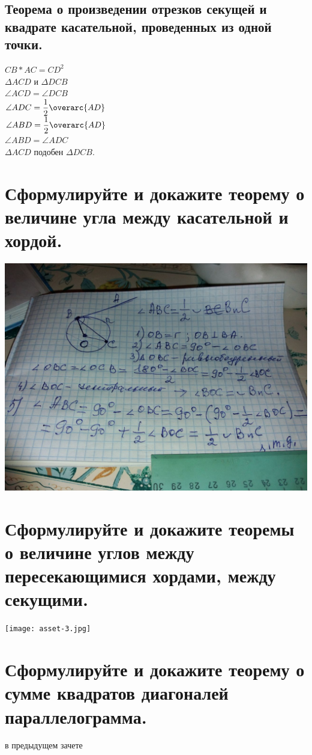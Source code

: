 \documentclass[12pt, letterpaper]{article}
\begin{document}
\subsection{Теорема о произведении отрезков секущей и квадрате касательной, проведенных из одной точки.}
\textbf{$CB*AC=CD^2$ \\}
$\Delta ACD $ и $ \Delta DCB $ \\
$ \angle ACD = \angle DCB $ \\ 
$ \angle ADC  = \dfrac{1}{2} \overarc{AD} $ \\
$ \angle ABD  = \dfrac{1}{2} \overarc{AD} $ \\
$ \angle ABD  = \angle ADC $ \\
$ \Delta ACD $ подобен $ \Delta DCB $. \\


\section {Сформулируйте и докажите теорему о величине угла между касательной и хордой.}
\includegraphics[scale=0.3]{asset-2.png} \\

\section {Сформулируйте и докажите теоремы о величине углов между пересекающимися хордами, между секущими.}
\texttt{[image: asset-3.jpg]} \\


\section {Сформулируйте и докажите теорему о сумме квадратов диагоналей параллелограмма.}
в предыдущем зачете
\end{document}
